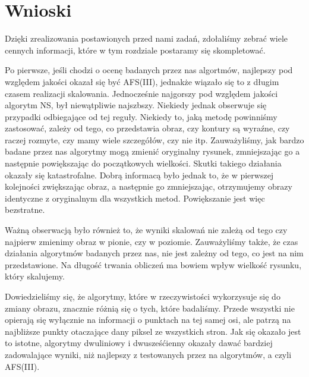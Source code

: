 \section{Wnioski}
Dzięki zrealizowania postawionych przed nami zadań, zdołaliśmy zebrać wiele
cennych informacji, które w tym rozdziale postaramy się skompletować.

Po pierwsze, jeśli chodzi o ocenę badanych przez nas algortmów, najlepszy
pod względem jakości okazał się być AFS(III), jednakże wiązało się to z długim czasem
realizacji skalowania. Jednocześnie najgorszy pod względem jakości algorytm NS,
był niewątpliwie najszbszy. Niekiedy jednak obserwuje się przypadki odbiegające od tej reguły.
Niekiedy to, jaką metodę powinniśmy zastosować, zależy od tego, co przedstawia obraz,
czy kontury są wyraźne, czy raczej rozmyte, czy mamy wiele szczegółów, czy nie itp. Zauważyliśmy, jak bardzo badane przez nas algorytmy mogą zmienić
oryginalny rysunek, zmniejszając go a następnie powiększając do początkowych wielkości. Skutki takiego działania okazały się katastrofalne.
Dobrą informacą było jednak to, że w pierwszej kolejności zwiększając obraz, a następnie
go zmniejszając, otrzymujemy obrazy identyczne z oryginalnym dla wszystkich metod.
Powiększanie jest więc bezstratne.

Ważną obserwacją było również to, że wyniki skalowań nie zależą od tego czy
najpierw zmienimy obraz w pionie, czy w poziomie. Zauważyliśmy także, że czas
działania algorytmów badanych przez nas, nie jest zależny od tego, co jest
na nim przedstawione. Na długość trwania obliczeń ma bowiem wpływ wielkość rysunku, który skalujemy.

Dowiedzieliśmy się, że algorytmy, które w rzeczywistości wykorzysuje się do zmiany obrazu, znacznie różnią się o tych, które badaliśmy.
Przede wszystki nie opierają się wyłącznie na informacji o punktach na tej samej osi, ale patrzą na najbliższe punkty otaczające dany piksel ze wszystkich stron.
Jak się okazało jest to istotne, algorytmy dwuliniowy i dwusześćienny okazały dawać bardziej zadowalające wyniki, niż najlepszy z testowanych przez na algorytmów, a czyli AFS(III).
